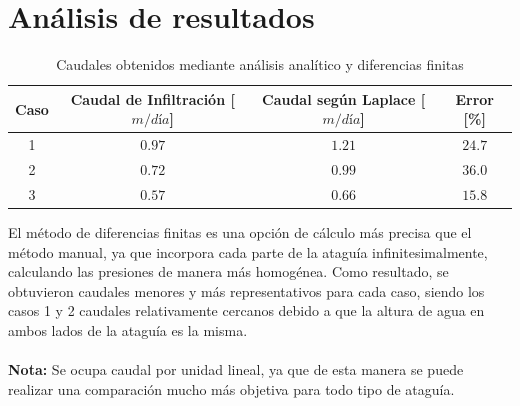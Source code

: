 \section{Análisis de resultados}

\begin{table}[H]
    \centering
    \caption{Caudales obtenidos mediante análisis analítico y diferencias finitas}
    \vspace{0.5cm}
    \begin{tabular}{cccc}
        \hline
        \textbf{Caso} & \textbf{Caudal de Infiltración [$m/día$]} & \textbf{Caudal según Laplace [$m/día$]} & \textbf{Error [\%]} \\
        \hline
        1 & $0.97$ & $1.21$ & $24.7$ \\
        2 & $0.72$ & $0.99$ & $36.0$ \\
        3 & $0.57$ & $0.66$ & $15.8$ \\
        \hline
    \end{tabular}
    \label{tab:Diferencias1}
\end{table}

El método de diferencias finitas es una opción de cálculo más precisa que el método manual, ya que incorpora cada parte de la ataguía infinitesimalmente, calculando las presiones de manera más homogénea. Como resultado, se obtuvieron caudales menores y más representativos para cada caso, siendo los casos 1 y 2 caudales relativamente cercanos debido a que la altura de agua en ambos lados de la ataguía es la misma.
\\ \\
\textbf{Nota:} Se ocupa caudal por unidad lineal, ya que de esta manera se puede realizar una comparación mucho más objetiva para todo tipo de ataguía. 

